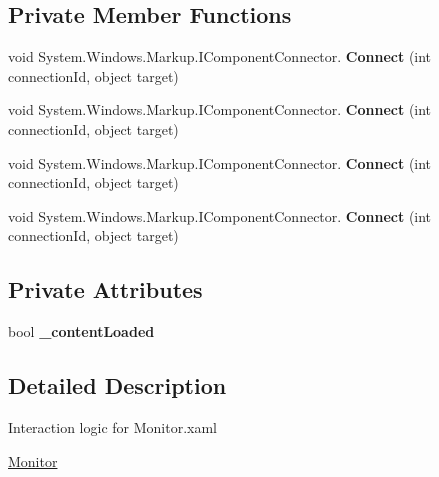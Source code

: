 \subsection*{Private Member Functions}
\begin{DoxyCompactItemize}
\item 
\mbox{\label{class_t_h_b___plugin___exams_1_1_monitor_acafc947f48f9dbde9c1b0d726aae5c1f}} 
void System.\+Windows.\+Markup.\+I\+Component\+Connector. {\bfseries Connect} (int connection\+Id, object target)
\item 
\mbox{\label{class_t_h_b___plugin___exams_1_1_monitor_acafc947f48f9dbde9c1b0d726aae5c1f}} 
void System.\+Windows.\+Markup.\+I\+Component\+Connector. {\bfseries Connect} (int connection\+Id, object target)
\item 
\mbox{\label{class_t_h_b___plugin___exams_1_1_monitor_acafc947f48f9dbde9c1b0d726aae5c1f}} 
void System.\+Windows.\+Markup.\+I\+Component\+Connector. {\bfseries Connect} (int connection\+Id, object target)
\item 
\mbox{\label{class_t_h_b___plugin___exams_1_1_monitor_acafc947f48f9dbde9c1b0d726aae5c1f}} 
void System.\+Windows.\+Markup.\+I\+Component\+Connector. {\bfseries Connect} (int connection\+Id, object target)
\end{DoxyCompactItemize}
\subsection*{Private Attributes}
\begin{DoxyCompactItemize}
\item 
\mbox{\label{class_t_h_b___plugin___exams_1_1_monitor_a9d12d6aaf4f374b5a3b9c4d1128e9a6a}} 
bool {\bfseries \+\_\+content\+Loaded}
\end{DoxyCompactItemize}


\subsection{Detailed Description}
Interaction logic for Monitor.\+xaml 

\mbox{\hyperlink{class_t_h_b___plugin___exams_1_1_monitor}{Monitor}} 


